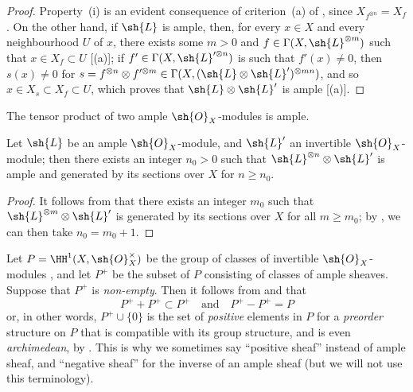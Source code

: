 \begin{proof}
  Property~(i) is an evident consequence of criterion~(a) of , since $X_{f^{\otimes n}}=X_f$.
  On the other hand, if $\sh{L}$ is ample, then, for every $x\in X$ and every neighbourhood $U$ of $x$, there exists some $m>0$ and $f\in\Gamma(X,\sh{L}^{\otimes m})$ such that $x\in X_f\subset U$ [(a)];
  if $f'\in\Gamma(X,\sh{L}'^{\otimes n})$ is such that $f'(x)\neq0$, then $s(x)\neq0$ for $s=f^{\otimes n}\otimes f'^{\otimes m}\in\Gamma(X,(\sh{L}\otimes\sh{L}')^{\otimes mn})$, and so $x\in X_s\subset X_f\subset U$, which proves that $\sh{L}\otimes\sh{L}'$ is ample [(a)].
\end{proof}

\begin{corollary}[4.5.7]
\label{II.4.5.7}
The tensor product of two ample $\sh{O}_X$-modules is ample.
\end{corollary}

\begin{corollary}[4.5.8]
\label{II.4.5.8}
Let $\sh{L}$ be an ample $\sh{O}_X$-module, and $\sh{L}'$ an invertible $\sh{O}_X$-module;
then there exists an integer $n_0>0$ such that $\sh{L}^{\otimes n}\otimes\sh{L}'$ is ample and generated by its sections over $X$ for $n\geq n_0$.
\end{corollary}

\begin{proof}
It follows from  that there exists an integer $m_0$ such that $\sh{L}^{\otimes m}\otimes\sh{L}'$ is generated by its sections over $X$ for all $m\geq m_0$;
by , we can then take $n_0=m_0+1$.
\end{proof}

\begin{remark}[4.5.9]
\label{II.4.5.9}
Let $P=\HH^1(X,\sh{O}_X^\times)$ be the group of classes of invertible $\sh{O}_X$-modules , and let $P^+$ be the subset of $P$ consisting of classes of ample sheaves.
Suppose that $P^+$ is \emph{non-empty}.
Then it follows from  and  that
\[
  P^+ + P^+ \subset P^+
  \quad\text{and}\quad
  P^+ - P^+ = P
\]
or, in other words, $P^+\cup\{0\}$ is the set of \emph{positive} elements in $P$ for a \emph{preorder} structure on $P$ that is compatible with its group structure, and is even \emph{archimedean}, by .
This is why we sometimes say ``positive sheaf'' instead of ample sheaf, and ``negative sheaf'' for the inverse of an ample sheaf (but we will not use this terminology).
\end{remark}

